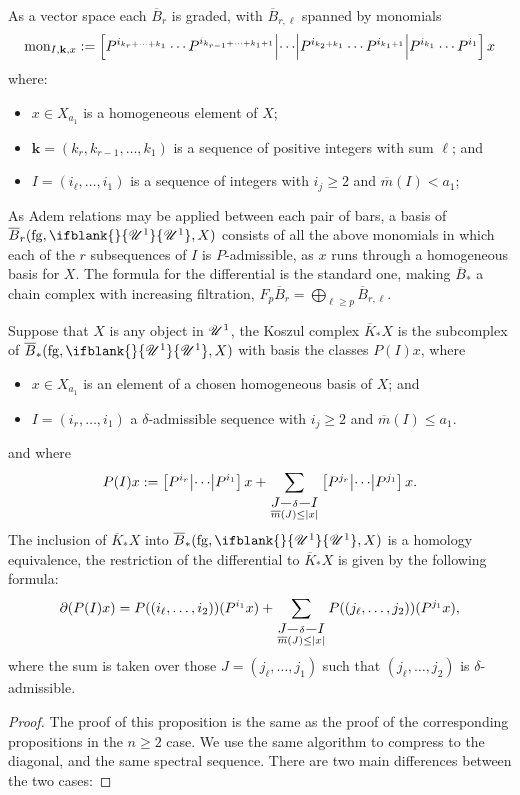 \documentclass[11pt]{article}
\makeatletter
\newcommand{\nontop}[1]{\scrU^{#1}}%
\newcommand{\produces}[3]{{#1}{#3}{#2}}
\newcommand{\forget}{\mathrm{fg}}
\newcommand{\Fr}[2][]{\ifblank{#1}{#2}{#2_{#1}}}
\newcommand{\minDimP}{\overline{m}}
\newcommand{\BarMonomial}[3]{\textup{mon}_{#1,#2,#3}}
\renewcommand{\produces}[3]{
{
\def\labelstyle{\scriptstyle}
\xymatrix@C=2em@1{
{#1}
\ar@{-}[r]|-{{\,#3\,}}
&%
{#2}%
}}}
\makeatother
\begin{document}
\begin{KoszulComplexes1}
\begin{prop*}
As a vector space each $\overline{B}_r$ is graded, with $\overline{B}_{r,\ell}$
spanned by monomials
\[\BarMonomial{I}{\textbf{k}}{x}:=\left[P^{i_{k_r+\cdots +k_1}}\cdots P^{i_{k_{r-1}+\cdots +k_1+1}}
\middle|\cdots 
\middle|P^{i_{k_2+k_1}}\cdots P^{i_{k_1+1}}
\middle|P^{i_{k_1}}\cdots P^{i_1}\right]
x\]
where:
\begin{itemize}
\setlength{\parindent}{.25in}
\item $x\in X_{a_1}$ is a homogeneous element of $X$;
\item $\textbf{k}=(k_r,k_{r-1},\ldots,k_{1})$ is a sequence of positive integers with sum $\ell$; and
\item $I=(i_\ell,\ldots,i_1)$ is a sequence of integers with $i_j\geq2$ and $\minDimP(I)<a_1$;
\end{itemize}
As Adem relations may be applied between each pair of bars, a basis of $\overline{B}_r(\forget,\Fr{\nontop{1}},X)$ consists of all the above monomials in which each of the $r$ subsequences of $I$ is $P$-admissible, as $x$ runs through a homogeneous basis for $X$. The formula for the differential is the standard one, making %
 $\overline{B}_*$ a chain complex with increasing filtration, $F_p\overline{B}_r=\bigoplus_{\ell\geq p}\overline{B}_{r,\ell}$. 
\end{prop*}


\begin{prop*}
Suppose that $X$ is any object in $\nontop{1}$, the Koszul complex $\overline{K}_*X$ is the subcomplex of $\overline{B}_*(\forget,\Fr{\nontop{1}},X)$ with basis the classes $P(I)x$, where 
\begin{itemize}
\setlength{\parindent}{.25in}
\item $x\in X_{a_1}$ is an element of a chosen homogeneous basis of $X$;  and
\item $I=(i_r,\ldots,i_1)$ a $\delta$-admissible sequence with $i_j\geq2$ and $\minDimP(I)\leq a_1$.
\end{itemize}
and where 
\[P(I)x:=\left[P^{i_r} \middle|\cdots\middle|P^{i_1} \right]x+\sum_{\substack{\produces{J}{I}{\delta} \\ \minDimP(J)\leq|x|}}\left[P^{j_r} \middle|\cdots\middle|P^{j_1} \right]x.\]
The inclusion of $\overline{K}_*X$ into $\overline{B}_*(\forget,\Fr{\nontop{1}},X)$ is a homology equivalence, the restriction of the differential to $\overline{K}_*X$ is given by the following formula:
\[\partial(P(I)x)=P((i_{\ell},\ldots,i_2))(P^{i_1}x)+\sum_{\substack{\produces{J}{I}{\delta} \\ \minDimP(J)\leq|x|}} P((j_{\ell},\ldots,j_2))(P^{j_1}x),\]
where the sum is taken over those $J=(j_{\ell},\ldots,j_1)$ such that $(j_{\ell},\ldots,j_2)$ is $\delta$-admissible.
\end{prop*}
\begin{proof}
The proof of this proposition is the same as the proof of the corresponding propositions in the $n\geq2$ case. We use the same algorithm to compress to the diagonal, and the same spectral sequence. There are two main differences between the two cases:


\end{proof}
\end{KoszulComplexes1}
\end{document}
